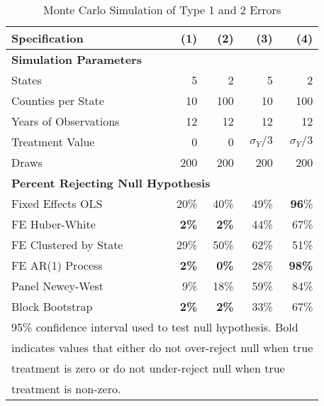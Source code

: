 \documentclass[12pt]{article}
\begin{document}
\begin{table}[H]
	\centering
	\caption{Monte Carlo Simulation of Type 1 and 2 Errors}
	\begin{tabular}{lrrrr} \hline \hline
		Specification &(1) & (2) & (3) & (4)  \\  
		\hline \textbf{Simulation Parameters} & & & & \\
		States &   5 &    2 & 5 & 2\\
		Counties per State &        10 &        100 & 10 & 100\\
		Years of Observations &        12 &        12 & 12 & 12 \\
		Treatment Value &        0 &        0 & $\sigma_{Y}/3$ & $\sigma_{Y}/3$\\
		Draws &       200 & 200 & 200 & 200\\
		\hline \multicolumn{5}{l}{\textbf{Percent Rejecting Null Hypothesis}} \\
		Fixed Effects OLS &      20\% &      40\%& 49\%& \textbf{96}\%\\
		FE Huber-White &       \textbf{2\%} &       \textbf{2\%}& 44\%& 67\%\\
		FE Clustered by State &         29\% &         50\%& 62\% & 51\%\\
		FE AR(1) Process &         \textbf{2\%} &         \textbf{0\%}& 28\%& \textbf{98\%}\\
		Panel Newey-West &         9\% &         18\%& 59\% & 84\%\\
		Block Bootstrap &        \textbf{2\%} &         \textbf{2\%}& 33\%& 67\%\\
		\hline \hline 
		\multicolumn{5}{l}{\footnotesize 95\% confidence interval used to test null hypothesis. Bold  }\\
		\multicolumn{5}{l}{\footnotesize indicates values that either do not over-reject null when true }\\
		\multicolumn{5}{l}{\footnotesize  treatment is zero or do not under-reject null when true  }\\
		\multicolumn{5}{l}{\footnotesize treatment is non-zero. }\\
	\end{tabular}	
	\label{tab:mc}
\end{table}
\end{document}
